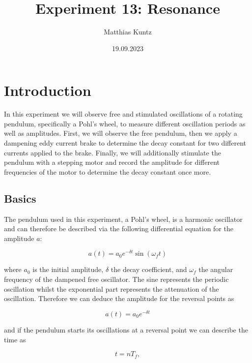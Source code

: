 \documentclass{article}
\title{Experiment 13: Resonance}
\author{Matthias Kuntz}
\date{19.09.2023}
\begin{document}
\maketitle

\section{Introduction}

In this experiment we will observe free and stimulated oscillations of a rotating pendulum, specifically a Pohl's wheel, to measure different oscillation periods as well as amplitudes. First, we will observe the free pendulum, then we apply a dampening eddy current brake to determine the decay constant for two different currents applied to the brake. Finally, we will additionally stimulate the pendulum with a stepping motor and record the amplitude for different frequencies of the motor to determine the decay constant once more. 

\subsection{Basics}

The pendulum used in this experiment, a Pohl's wheel, is a harmonic oscillator and can therefore be described via the following differential equation for the amplitude $a$:

\begin{equation}
    a(t) = a_0 e^{-\delta t} \sin{(\omega_f t)}
    \label{eq:1}
\end{equation}

where $a_0$ is the initial amplitude, $\delta$ the decay coefficient, and $\omega_f$ the angular frequency of the dampened free oscillator. The sine represents the periodic oscillation whilst the exponential part represents the attenuation of the oscillation. Therefore we can deduce the amplitude for the reversal points as

\begin{equation}
    a(t) = a_0 e^{-\delta t}
    \label{eq:2}
\end{equation}

and if the pendulum starts its oscillations at a reversal point we can describe the time as

\begin{equation}
    t = nT_f,
    \label{eq:3}
\end{equation}
\end{document}
